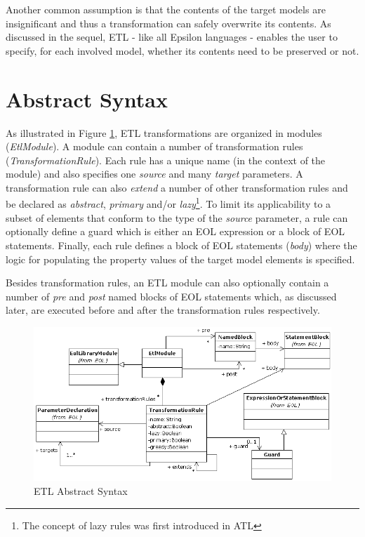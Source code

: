 Another common assumption is that the contents of the target models are insignificant and thus a transformation can safely overwrite its contents. As discussed in the sequel, ETL - like all Epsilon languages - enables the user to specify, for each involved model, whether its contents need to be preserved or not.

\section{Abstract Syntax}

As illustrated in Figure \ref{fig:EtlAbstractSyntax}, ETL transformations are organized in modules (\emph{EtlModule}). A module can contain a number of transformation rules (\emph{TransformationRule}). Each rule has a unique name (in the context of the module) and also specifies one \emph{source} and many \emph{target} parameters. A transformation rule can also \emph{extend} a number of other transformation rules and be declared as \emph{abstract}, \emph{primary} and/or \emph{lazy}\footnote{The concept of lazy rules was first introduced in ATL}. To limit its applicability to a subset of elements that conform to the type of the \emph{source} parameter, a rule can optionally define a guard which is either an EOL expression or a block of EOL statements. Finally, each rule defines a block of EOL statements (\emph{body}) where the logic for populating the property values of the target model elements is specified.

Besides transformation rules, an ETL module can also optionally contain a number of \emph{pre} and \emph{post} named blocks of EOL statements which, as discussed later, are executed before and after the transformation rules respectively.

\begin{landscape}
\begin{figure}
	\centering
		\includegraphics{images/EtlAbstractSyntax.png}
	\caption{ETL Abstract Syntax}
	\label{fig:EtlAbstractSyntax}
\end{figure}
\end{landscape}


